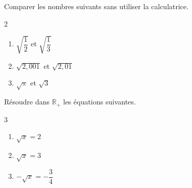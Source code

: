 \exo
Comparer les nombres suivants sans utiliser la calculatrice.
\setlength{\columnseprule}{0pt}
\begin{multicols}{2}
\begin{enumerate}
\item $\sqrt{\dfrac{1}{2}}$ et $\sqrt{\dfrac{1}{3}}$
\item $\sqrt{2,001}$ et $\sqrt{2,01}$
\item $\sqrt{\pi}$ et $\sqrt{3}$
\end{enumerate}
\end{multicols}

\exo
Résoudre dans $\mathbb{R}_+$ les équations suivantes.
\begin{multicols}{3}
\begin{enumerate}
\item $\sqrt{x}=2$
\item $\sqrt{x}=3$
\item $-\sqrt{x}=-\dfrac{3}{4}$
\end{enumerate}
\end{multicols}

